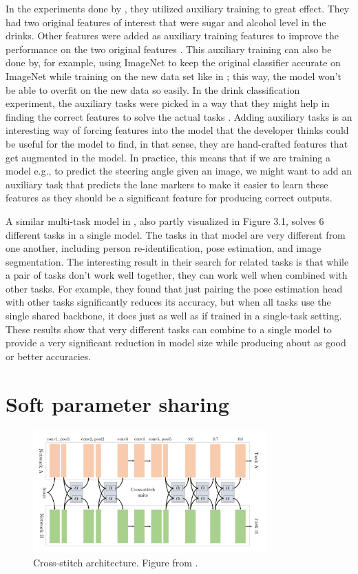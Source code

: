 In the experiments done by \citep{healthyDrink}, they utilized auxiliary training to great effect.
They had two original features of interest that were sugar and alcohol level in the drinks.
Other features were added as auxiliary training features to improve the performance on the two original features \citep{healthyDrink}.
This auxiliary training can also be done by, for example, using ImageNet to keep the original classifier accurate on ImageNet while training on the new data set like in \citep{biologicalMultitask}; this way, the model won't be able to overfit on the new data so easily.
In the drink classification experiment, the auxiliary tasks were picked in a way that they might help in finding the correct features to solve the actual tasks \citep{healthyDrink}.
Adding auxiliary tasks is an interesting way of forcing features into the model that the developer thinks could be useful for the model to find, in that sense, they are hand-crafted features that get augmented in the model.
In practice, this means that if we are training a model e.g., to predict the steering angle given an image, we might want to add an auxiliary task that predicts the lane markers to make it easier to learn these features as they should be a significant feature for producing correct outputs.

A similar multi-task model in \citep{visualPerson}, also partly visualized in Figure 3.1, solves 6 different tasks in a single model.
The tasks in that model are very different from one another, including person re-identification, pose estimation, and image segmentation.
The interesting result in their search for related tasks is that while a pair of tasks don't work well together, they can work well when combined with other tasks.
For example, they found that just pairing the pose estimation head with other tasks significantly reduces its accuracy, but when all tasks use the single shared backbone, it does just as well as if trained in a single-task setting.
These results show that very different tasks can combine to a single model to provide a very significant reduction in model size while producing about as good or better accuracies.

\section{Soft parameter sharing}

\begin{figure}[h!] 
\centering 
\includegraphics[width=0.8\textwidth]{imgs/stitch.png}
\caption{Cross-stitch architecture. Figure from \citep{crossStitch}.\label{fig:params}}
\end{figure}

